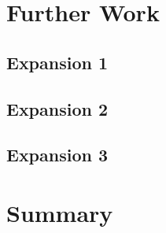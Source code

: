 \documentclass[a4paper, 11pt, twocolumn, twoside]{report}
\begin{document}
\section{Further Work}

\subsection{Expansion 1}

\subsection{Expansion 2}

\subsection{Expansion 3}

\section{Summary}


\end{document}
